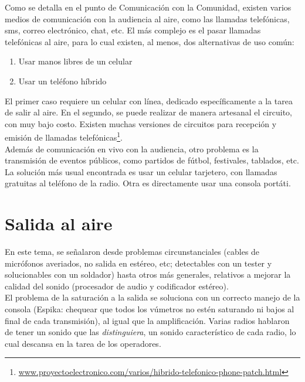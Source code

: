 Como se detalla en el punto de Comunicación con la Comunidad, existen varios medios de comunicación con la audiencia al aire, como las llamadas telefónicas, sms, correo electrónico, chat, etc. El más complejo es el pasar llamadas telefónicas al aire, para lo cual existen, al menos, dos alternativas de uso común:

\begin{enumerate}
  \item Usar manos libres de un celular
  \item Usar un teléfono híbrido
\end{enumerate}

El primer caso requiere un celular con línea, dedicado específicamente a la tarea de salir al aire. En el segundo, se puede realizar de manera artesanal el circuito, con muy bajo costo. Existen muchas versiones de circuitos para recepción y emisión de llamadas telefónicas\footnote{\href{http://www.proyectoelectronico.com/varios/hibrido-telefonico-phone-patch.html}{www.proyectoelectronico.com/varios/hibrido-telefonico-phone-patch.html}}.\\

Además de comunicación en vivo con la audiencia, otro problema es la transmisión de eventos públicos, como partidos de fútbol, festivales, tablados, etc. La solución más usual encontrada es usar un celular tarjetero, con llamadas gratuitas al teléfono de la radio. Otra es directamente usar una consola portáti.\\

\section{Salida al aire}

En este tema, se señalaron desde problemas circunstanciales (cables de micrófonos averiados, no salida en estéreo, etc; detectables con un tester y solucionables con un soldador) hasta otros más generales, relativos a mejorar la calidad del sonido (procesador de audio y codificador estéreo).\\

El problema de la saturación a la salida se soluciona con un correcto manejo de la consola (Espika: chequear que todos los vúmetros no estén saturando ni bajos al final de cada transmisión), al igual que la amplificación. Varias radios hablaron de tener un sonido que las \textit{distinguiera}, un sonido característico de cada radio, lo cual descansa en la tarea de los operadores.\\

